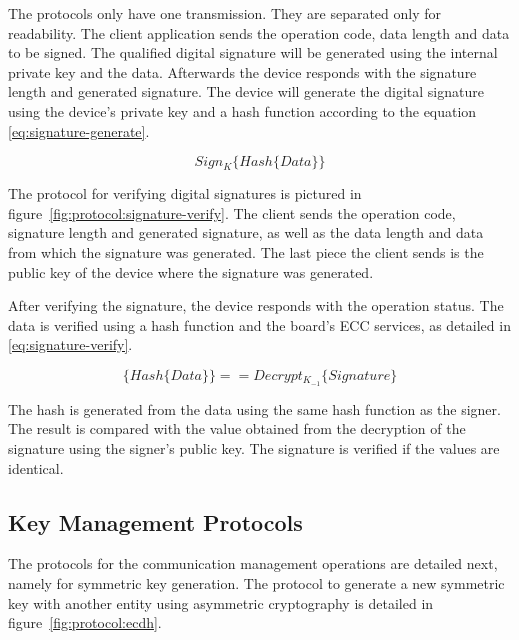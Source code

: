 The protocols only have one transmission. They are separated only for readability.
The client application sends the operation code, data length and data to be signed.
The qualified digital signature will be generated using the internal private key and the data. Afterwards the device responds with the signature length and generated signature.
The device will generate the digital signature using the device's private key and a hash function according to the equation \ref{eq:signature-generate}.

\begin{equation}
	\label{eq:signature-generate}
	Sign_{K}\{Hash\{Data\}\}
\end{equation}

The protocol for verifying digital signatures is pictured in figure~\ref{fig:protocol:signature-verify}.
The client sends the operation code, signature length and generated signature, as well as the data length and data from which the signature was generated. The last piece the client sends is the public key of the device where the signature was generated.

After verifying the signature, the device responds with the operation status.
The data is verified using a hash function and the board's \ac{ECC} services, as detailed in \ref{eq:signature-verify}.

\begin{equation}
	\label{eq:signature-verify}
	\{Hash\{Data\}\} == Decrypt_{K_{-1}}\{Signature\}
\end{equation}

The hash is generated from the data using the same hash function as the signer. The result is compared with the value obtained from the decryption of the signature using the signer's public key. The signature is verified if the values are identical.

\subsection{Key Management Protocols}\label{chap:implementation:protocol:key}

The protocols for the communication management operations are detailed next, namely for symmetric key generation. The protocol to generate a new symmetric key with another entity using asymmetric cryptography is detailed in figure~\ref{fig:protocol:ecdh}.

